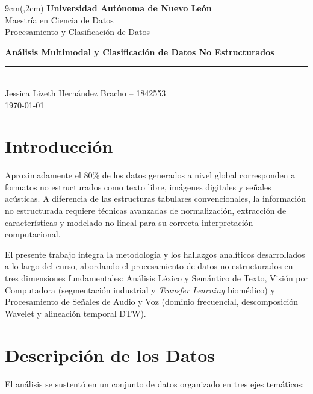 \documentclass[12pt]{article}
\newcommand{\TitleStyleOne}[1]{\bfseries\sffamily #1}
\begin{document}
\begin{textblock*}{9cm}(\paperwidth-4.5cm\relax,2cm)
\color{black}
\centering
\footnotesize\textbf{Universidad Autónoma de Nuevo León}\\
\footnotesize Maestría en Ciencia de Datos\\
\footnotesize Procesamiento y Clasificación de Datos
\end{textblock*}

\vspace*{0cm}

\begin{center}
    {\large \TitleStyleOne{Análisis Multimodal y Clasificación de Datos No Estructurados}}\\[0.5em]
    
    \rule{0.65\textwidth}{0.35pt}\\[0.7em]
    
    {\large{Jessica Lizeth Hernández Bracho -- 1842553}}\\[0.3em]
    {\today}
\end{center}

\vspace{0.8cm} 

\section{Introducción}

Aproximadamente el 80\% de los datos generados a nivel global corresponden a formatos no estructurados como texto libre, imágenes digitales y señales acústicas. A diferencia de las estructuras tabulares convencionales, la información no estructurada requiere técnicas avanzadas de normalización, extracción de características y modelado no lineal para su correcta interpretación computacional.

El presente trabajo integra la metodología y los hallazgos analíticos desarrollados a lo largo del curso, abordando el procesamiento de datos no estructurados en tres dimensiones fundamentales: Análisis Léxico y Semántico de Texto, Visión por Computadora (segmentación industrial y \textit{Transfer Learning} biomédico) y Procesamiento de Señales de Audio y Voz (dominio frecuencial, descomposición Wavelet y alineación temporal DTW).

\section{Descripción de los Datos}
El análisis se sustentó en un conjunto de datos organizado en tres ejes temáticos:
\end{document}
